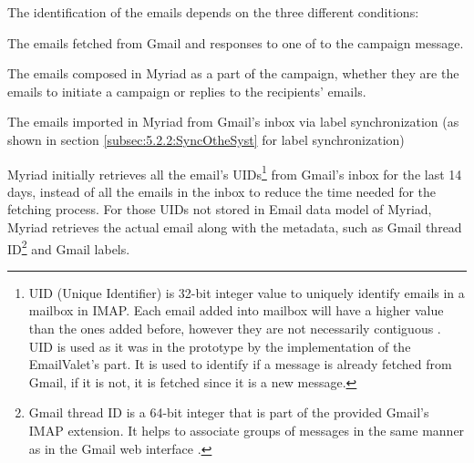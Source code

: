 The identification of the emails depends on the three different conditions:

\begin{compactenum}
	\item The emails fetched from Gmail and responses to one of to the campaign message.
	\item The emails composed in Myriad as a part of the campaign, whether they are the emails to initiate a campaign or replies to the recipients' emails.
	\item The emails imported in Myriad from Gmail's inbox via label synchronization (as shown in section \ref{subsec:5.2.2:SyncOtheSyst} for label synchronization)
\end{compactenum}

Myriad initially retrieves all the email's \ac{UID}s\footnote{UID (Unique Identifier) is 32-bit integer value to uniquely identify emails in a mailbox in \ac{IMAP}. Each email added into mailbox will have a higher value than the ones added before, however they are not necessarily contiguous \citep{rfc3501}. \ac{UID} is used as it was in the prototype by the implementation of the EmailValet's part. It is used to identify if a message is already fetched from Gmail, if it is not, it is fetched since it is a new message.} from Gmail's inbox for the last 14 days, instead of all the emails in the inbox to reduce the time needed for the fetching process. For those \ac{UID}s not stored in Email data model of Myriad, Myriad retrieves the actual email along with the metadata, such as Gmail thread ID\footnote{Gmail thread ID is a 64-bit integer that is part of the provided Gmail's IMAP extension. It helps to associate groups of messages in the same manner as in the Gmail web interface \citep{GoogleInc.2013a}.} and Gmail labels.
\vspace{1cm}

